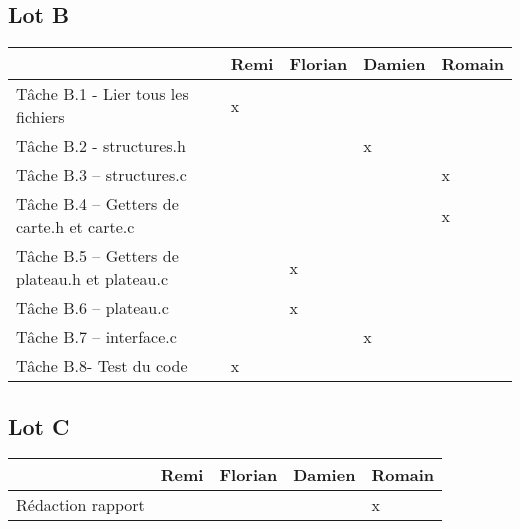 \documentclass[11pt]{article}
\begin{document}
\subsection{Lot B}
\begin{tabular}{|p{8cm}|p{1.3cm}|p{1.3cm}|p{1.4cm}|p{1.6cm}|}
\hline
& Remi  & Florian  &  Damien &  Romain \\
\hline
Tâche B.1 - Lier tous les fichiers & x& & & \\
\hline
Tâche B.2 - structures.h&  &  &x &  \\
\hline
Tâche B.3 – structures.c& & & &x \\
\hline
Tâche B.4 – Getters de carte.h et carte.c & & &  & x \\
\hline
Tâche B.5 – Getters de plateau.h et plateau.c & &x &  &  \\
\hline
Tâche B.6 – plateau.c & &x &  &  \\
\hline
Tâche B.7 – interface.c & & & x &  \\
\hline
Tâche B.8-  Test du code&x&&  &\\
\hline
\end{tabular}

\subsection{Lot C}

\begin{tabular}{|p{8cm}|p{1.3cm}|p{1.3cm}|p{1.4cm}|p{1.6cm}|}
\hline
& Remi  & Florian  &  Damien &  Romain \\
\hline
Rédaction rapport  & & & &x \\
\hline
\end{tabular}
\end{document}
